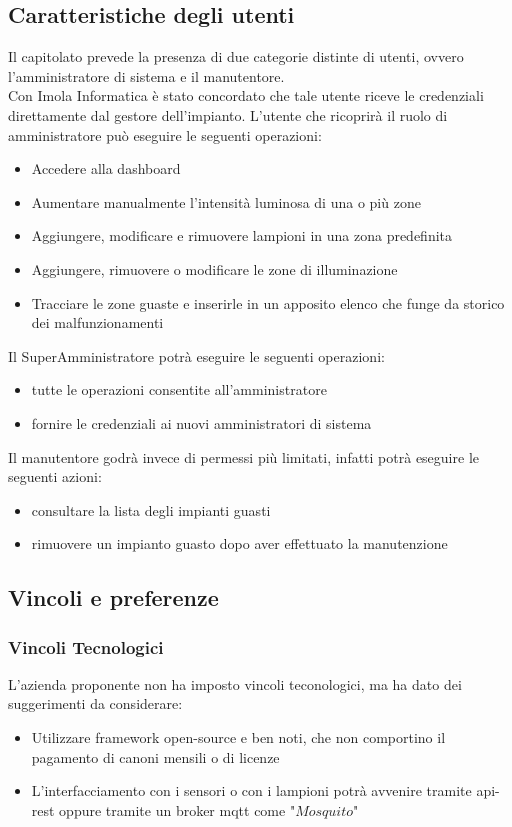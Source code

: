 \documentclass[12pt]{article}
\begin{document}
\subsection{Caratteristiche degli utenti}
Il capitolato prevede la presenza di due categorie distinte di utenti, ovvero l'amministratore di sistema e il manutentore. \\
Con Imola Informatica è stato concordato che tale utente riceve le credenziali direttamente dal gestore dell'impianto.
L'utente che ricoprirà il ruolo di amministratore può eseguire le seguenti operazioni:
\begin{itemize}
	\item Accedere alla dashboard
	\item Aumentare manualmente l'intensità luminosa di una o più zone
	\item Aggiungere, modificare e rimuovere lampioni in una zona predefinita
	\item Aggiungere, rimuovere o modificare le zone di illuminazione
	\item Tracciare le zone guaste e inserirle in un apposito elenco che funge da storico dei malfunzionamenti
\end{itemize}
Il SuperAmministratore potrà eseguire le seguenti operazioni:
\begin{itemize}
	\item tutte le operazioni consentite all'amministratore
	\item fornire le credenziali ai nuovi amministratori di sistema
\end{itemize}
Il manutentore godrà invece di permessi più limitati, infatti potrà eseguire le seguenti azioni:
\begin{itemize}
	\item consultare la lista degli impianti guasti
	\item rimuovere un impianto guasto dopo aver effettuato la manutenzione
\end{itemize}
\subsection{Vincoli e preferenze}

\subsubsection{Vincoli Tecnologici}
L'azienda proponente non ha imposto vincoli teconologici, ma ha dato dei suggerimenti da considerare:
\begin{itemize}
	\item Utilizzare framework open-source e ben noti, che non comportino il pagamento di canoni mensili o di licenze
	\item L'interfacciamento con i sensori o con i lampioni potrà avvenire tramite api-rest oppure tramite un broker mqtt come "$Mosquito$"
\end{itemize}
\end{document}

